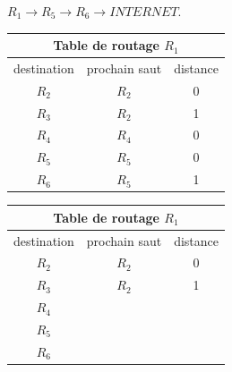 \begin{enumerate}[series=monDS, resume]
\begin{minipage}[h]{0.5\textwidth}
\begin{blocvisiblex}[height=1]
{\quad}
 $R_1 \rightarrow R_5 \rightarrow R_6 \rightarrow INTERNET$.
    \end{blocvisiblex}
\end{minipage}\hfill{}
\begin{minipage}[h]{0.44\textwidth}
\begin{blocvisiblex}[height=5]
    {\centering
    \renewcommand{\arraystretch}{1.3}
    \begin{tabular}{|c|c|c|}
        \hline
        \multicolumn{3}{|c|}{\textbf{Table de routage $R_1$}} \\ \hline
        destination & prochain saut & distance \\ \hline
        $R_2$       & $R_2$         & 0        \\ \hline
        $R_3$       & $R_2$         & 1        \\ \hline
        $R_4$       & $R_4$         & 0        \\ \hline
        $R_5$       & $R_5$         & 0        \\ \hline
        $R_6$       & $R_5$         & 1        \\ \hline
    \end{tabular}}
\centering
    \renewcommand{\arraystretch}{1.3}
    \begin{tabular}{|c|c|c|}
        \hline
        \multicolumn{3}{|c|}{\textbf{Table de routage $R_1$}} \\ \hline
        destination & prochain saut & distance \\ \hline
        $R_2$       & $R_2$         & 0        \\ \hline
        $R_3$       & $R_2$         & 1        \\ \hline
        $R_4$       &               &          \\ \hline
        $R_5$       &               &          \\ \hline
        $R_6$       &               &          \\ \hline
    \end{tabular}
\end{blocvisiblex}
    
\end{minipage}
 \end{enumerate}

 \medskip



\smallskip

